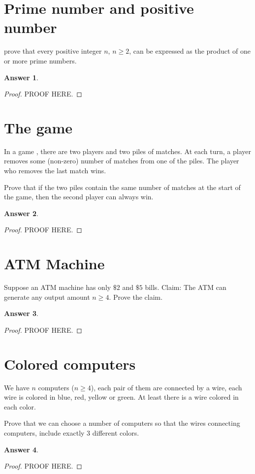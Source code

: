 \documentclass[a4paper]{article}
\renewcommand{\(}{\left(}
\renewcommand{\)}{\right)}
\theoremstyle{plain}
\theoremstyle{plain}
\theoremstyle{definition}
\newtheorem*{answer}{Answer}
\begin{document}
\section{Prime number and positive number}
prove that every positive integer $n$, $n \geq 2$, can be expressed as the product of one or more prime numbers.
\begin{shaded}
\begin{answer}
\begin{proof}
PROOF HERE.
\end{proof}
\end{answer}
\end{shaded}

\section{The game}
In a game , there are two players and two piles of matches. At each turn, a player removes some (non-zero) number of matches from one of the piles. The player who removes the last match wins.

Prove that if the two piles contain the same number of matches at the start of the game, then the second player can always win.

\begin{shaded}
\begin{answer}
\begin{proof}
PROOF HERE.
\end{proof}
\end{answer}
\end{shaded}

\section{ATM Machine}
Suppose an ATM machine has only $\$2$ and $\$5$ bills.
Claim: The ATM can generate any output amount $n \geq 4$.
Prove the claim.
\begin{shaded}
\begin{answer}
\begin{proof}
PROOF HERE.
\end{proof}
\end{answer}
\end{shaded}

\section{Colored computers}
We have $n$ computers ($n \geq 4$), each pair of them are connected by a wire, each wire is colored in blue, red, yellow or green. At least there is a wire colored in each color.

Prove that we can choose a number of computers so that the wires connecting computers, include exactly 3 different colors.

\begin{shaded}
\begin{answer}
\begin{proof}
PROOF HERE.
\end{proof}
\end{answer}
\end{shaded}
\end{document}
